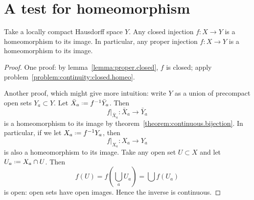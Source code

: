 \section{A test for homeomorphism}
\begin{corollary}\label{corollary:proper.bijection}
Take a locally compact Hausdorff space \(Y\).
Any closed injection \(f \colon X \to Y\) is a homeomorphism to its image.
In particular, any proper injection \(f \colon X \to Y\) is a homeomorphism to its image.
\end{corollary}
\begin{proof}
One proof: by lemma~\vref{lemma:proper.closed}, \(f\) is closed; apply problem~\vref{problem:continuity:closed.homeo}.

Another proof, which might give more intuition: write \(Y\) as a union of precompact open sets \(Y_a \subset Y\).
Let \(\bar{X}_a \defeq f^{-1}\bar{Y}_a\).
Then
\[
\left.f\right|_{\bar{X}_a} \colon \bar{X}_a \to \bar{Y}_a
\]
is a homeomorphism to its image by theorem~\vref{theorem:continuous.bijection}.
In particular, if we let \(X_a \defeq f^{-1}Y_a\), then
\[
\left.f\right|_{X_a} \colon X_a \to Y_a
\]
is also a homeomorphism to its image.
Take any open set \(U \subset X\) and let \(U_a \defeq X_a \cap U\).
Then
\[
f(U) = f(\bigcup_a U_a) = \bigcup f(U_a)
\]
is open: open sets have open images.
Hence the inverse is continuous.
\end{proof}

